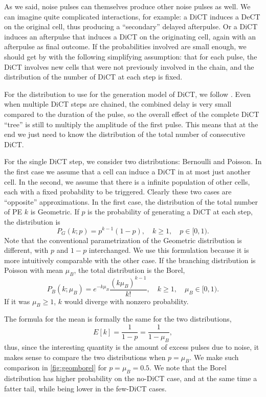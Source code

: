 As we said, noise pulses can themselves produce other noise pulses as well. We
can imagine quite complicated interactions, for example: a DiCT induces a DeCT
on the original cell, thus producing a ``secondary'' delayed afterpulse. Or a
DiCT induces an afterpulse that induces a DiCT on the originating cell, again
with an afterpulse as final outcome. If the probabilities involved are small
enough, we should get by with the following simplifying assumption: that for
each pulse, the DiCT involves new cells that were not previously involved in
the chain, and the distribution of the number of DiCT at each step is fixed.

For the distribution to use for the generation model of DiCT, we follow
\cite{vinogradov2012}. Even when multiple DiCT steps are chained, the combined
delay is very small compared to the duration of the pulse, so the overall
effect of the complete DiCT ``tree'' is still to multiply the amplitude of the
first pulse. This means that at the end we just need to know the distribution
of the total number of consecutive DiCT.

For the single DiCT step, we consider two distributions: Bernoulli and Poisson.
In the first case we assume that a cell can induce a DiCT in at most just
another cell. In the second, we assume that there is a infinite population of
other cells, each with a fixed probability to be triggered. Clearly these two
cases are ``opposite'' approximations. In the first case, the distribution of
the total number of PE $k$ is Geometric. If $p$ is the probability of
generating a DiCT at each step, the distribution is
%
\begin{equation}
    P_G(k;p) = p^{k-1}(1-p), \quad k \ge 1, \quad p \in [0,1).
    \label{eq:geometric}
\end{equation}
%
Note that the conventional parametrization of the Geometric distribution is
different, with $p$ and $1 - p$ interchanged. We use this formulation because
it is more intuitively comparable with the other case. If the branching
distribution is Poisson with mean $\mu_B$, the total distribution is the Borel,
%
\begin{equation}
    P_B(k;\mu_B) = e^{-k\mu_B} \frac {(k\mu_B)^{k-1}} {k!},
    \quad k \ge 1, \quad \mu_B \in [0,1).
    \label{eq:borel}
\end{equation}
%
If it was $\mu_B \ge 1$, $k$ would diverge with nonzero probability.

The formula for the mean is formally the same for the two distributions,
%
\begin{equation}
    E[k] = \frac 1 {1 - p} = \frac 1 {1 - \mu_B},
\end{equation}
%
thus, since the interesting quantity is the amount of excess pulses due to
noise, it makes sense to compare the two distributions when $p = \mu_B$. We
make such comparison in \autoref{fig:geomborel} for $p = \mu_B = 0.5$. We note
that the Borel distribution has higher probability on the no-DiCT case, and at
the same time a fatter tail, while being lower in the few-DiCT cases.

